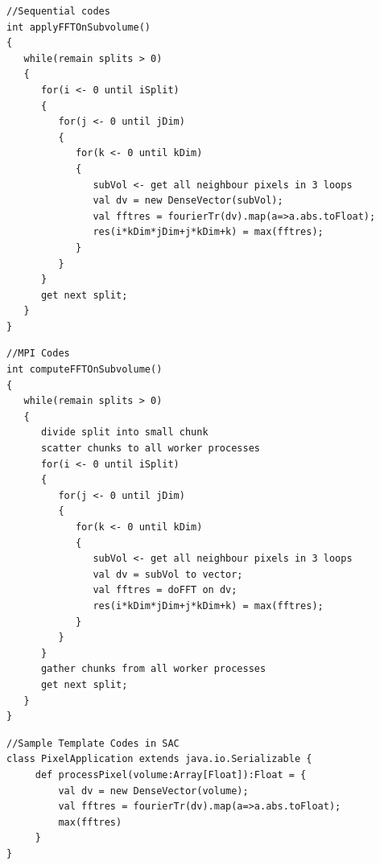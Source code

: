 \lstset{language=Java,frame=single}
\begin{lstlisting}[float,caption= Sequential Pseudo Codes of FFT on Subvolume, label=SeqCodeFFT]
//Sequential codes
int applyFFTOnSubvolume() 
{
   while(remain splits > 0) 
   {
      for(i <- 0 until iSplit)
      {
         for(j <- 0 until jDim)
         {
            for(k <- 0 until kDim)
            {
               subVol <- get all neighbour pixels in 3 loops
               val dv = new DenseVector(subVol);
               val fftres = fourierTr(dv).map(a=>a.abs.toFloat); 
               res(i*kDim*jDim+j*kDim+k) = max(fftres);
            }
         }
      }
      get next split;
   }
}
\end{lstlisting}

\lstset{language=Java,frame=single}
\begin{lstlisting}[float,caption= Pseudo Codes of FFT on Subvolume in MPI, label=MPICodeFFT]
//MPI Codes
int computeFFTOnSubvolume() 
{
   while(remain splits > 0) 
   {    
      divide split into small chunk
      scatter chunks to all worker processes
      for(i <- 0 until iSplit)
      {
         for(j <- 0 until jDim)
         {
            for(k <- 0 until kDim)
            {
               subVol <- get all neighbour pixels in 3 loops
               val dv = subVol to vector;
               val fftres = doFFT on dv; 
               res(i*kDim*jDim+j*kDim+k) = max(fftres);
            }
         }
      }
      gather chunks from all worker processes 
      get next split;
   }
}
\end{lstlisting}

\lstset{language=Java,frame=single}
\begin{lstlisting}[float,caption= Sample Codes of FFT on Subvolume in Template of SAC,label=SACCodeFFT]
//Sample Template Codes in SAC
class PixelApplication extends java.io.Serializable {
     def processPixel(volume:Array[Float]):Float = {
         val dv = new DenseVector(volume);
         val fftres = fourierTr(dv).map(a=>a.abs.toFloat); 
         max(fftres)
     }
}
\end{lstlisting}


